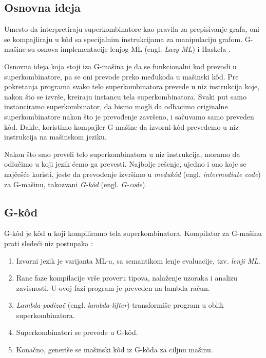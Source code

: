 \subsection{Osnovna ideja} 

Umesto da interpretiraju superkombinatore kao pravila za prepisivanje grafa, oni se kompajliraju u k\^ od sa specijalnim instrukcijama za manipulaciju grafom. G-mašine su osnova implementacije lenjog ML (engl. \textit{Lazy ML}) \cite{lazy-ML} i Haskela \cite{hbc}. 

Osnovna ideja koja stoji iza G-mašina je da se funkcionalni kod prevodi u superkombinatore, pa se oni prevode preko međukoda u mašinski k\^ od. Pre pokretanja programa svako telo superkombinatora prevede u niz instrukcija koje, nakon što se izvrše, kreiraju instancu tela superkombinatora. Svaki put samo instanciramo superkombinator, da bismo mogli da odbacimo originalne superkombinatore nakon što je prevođenje završeno, i sačuvamo samo preveden k\^ od. Dakle, koristimo kompajler G-mašine da izvorni k\^ od prevedemo u niz instrukcija na mašinskom jeziku.

Nakon što smo preveli telo superkombinatora u niz instrukcija, moramo da odlučimo u koji jezik ćemo ga prevesti. Najbolje rešenje, ujedno i ono koje se najčešće koristi, jeste da prevođenje izvršimo u \textit{međuk\^ od} (engl. \textit{intermediate code}) za G-mašinu, takozvani {\em G-k\^ od} (engl. \textit{G-code}).

\subsection{G-k\^ od}

G-k\^ od je k\^ od u koji kompiliramo tela superkombinatora. Kompilator za G-mašinu prati sledeći niz postupaka \cite{the-implementation-of-functional-programming-languages, abstract-machines}:

\begin{enumerate}
	\item Izvorni jezik je varijanta ML-a, sa semantikom lenje evaluacije, tzv. {\em lenji ML}.
	\item Rane faze kompilacije vrše proveru tipova, nalaženje uzoraka i analizu zavisnosti. U ovoj fazi program je preveden na lambda račun.
	\item \textit{Lambda-podizač} (engl. \textit{lambda-lifter}) transformiše program u oblik superkombinatora.   
	\item Superkombinatori se prevode u G-k\^ od.
	\item Konačno, generiše se mašinski k\^ od iz G-k\^ oda za ciljnu mašinu.
\end{enumerate}

